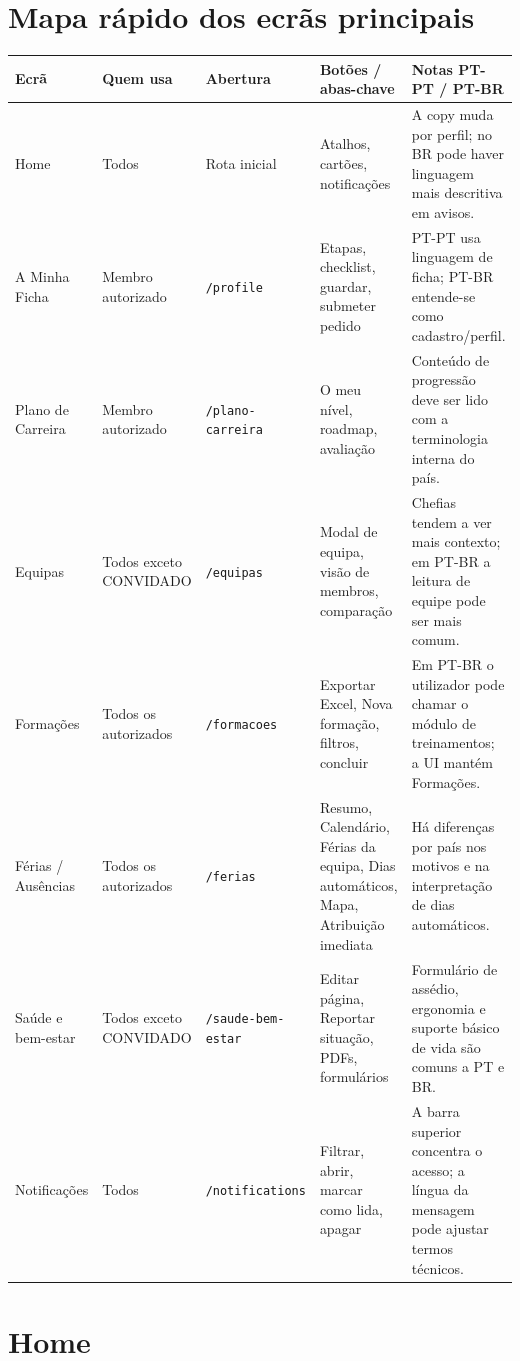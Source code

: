 \section{Mapa rápido dos ecrãs principais}
\begin{longtable}{|p{}|p{}|p{}|p{}|p{}|}
\hline
\textbf{Ecrã} & \textbf{Quem usa} & \textbf{Abertura} & \textbf{Botões / abas-chave} & \textbf{Notas PT-PT / PT-BR} \\
\hline
Home & Todos & Rota inicial & Atalhos, cartões, notificações & A copy muda por perfil; no BR pode haver linguagem mais descritiva em avisos. \\
\hline
A Minha Ficha & Membro autorizado & \texttt{/profile} & Etapas, checklist, guardar, submeter pedido & PT-PT usa linguagem de ficha; PT-BR entende-se como cadastro/perfil. \\
\hline
Plano de Carreira & Membro autorizado & \texttt{/plano-carreira} & O meu nível, roadmap, avaliação & Conteúdo de progressão deve ser lido com a terminologia interna do país. \\
\hline
Equipas & Todos exceto CONVIDADO & \texttt{/equipas} & Modal de equipa, visão de membros, comparação & Chefias tendem a ver mais contexto; em PT-BR a leitura de equipe pode ser mais comum. \\
\hline
Formações & Todos os autorizados & \texttt{/formacoes} & Exportar Excel, Nova formação, filtros, concluir & Em PT-BR o utilizador pode chamar o módulo de treinamentos; a UI mantém Formações. \\
\hline
Férias / Ausências & Todos os autorizados & \texttt{/ferias} & Resumo, Calendário, Férias da equipa, Dias automáticos, Mapa, Atribuição imediata & Há diferenças por país nos motivos e na interpretação de dias automáticos. \\
\hline
Saúde e bem-estar & Todos exceto CONVIDADO & \texttt{/saude-bem-estar} & Editar página, Reportar situação, PDFs, formulários & Formulário de assédio, ergonomia e suporte básico de vida são comuns a PT e BR. \\
\hline
Notificações & Todos & \texttt{/notifications} & Filtrar, abrir, marcar como lida, apagar & A barra superior concentra o acesso; a língua da mensagem pode ajustar termos técnicos. \\
\hline
\end{longtable}

\section{Home}
